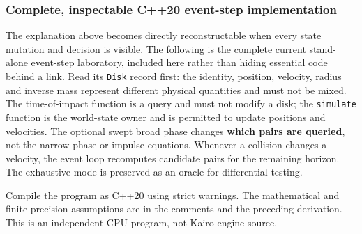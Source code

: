 \subsubsection{Complete, inspectable C++20 event-step implementation}\label{06-engine-ii-ch046-complete-inspectable-c20-event-step-implementation}

The explanation above becomes directly reconstructable when every state mutation and decision is visible. The following is the complete current stand-alone event-step laboratory, included here rather than hiding essential code behind a link. Read its \texttt{Disk} record first: the identity, position, velocity, radius and inverse mass represent different physical quantities and must not be mixed. The time-of-impact function is a query and must not modify a disk; the \texttt{simulate} function is the world-state owner and is permitted to update positions and velocities. The optional swept broad phase changes \textbf{which pairs are queried}, not the narrow-phase or impulse equations. Whenever a collision changes a velocity, the event loop recomputes candidate pairs for the remaining horizon. The exhaustive mode is preserved as an oracle for differential testing.

Compile the program as C++20 using strict warnings. The mathematical and finite-precision assumptions are in the comments and the preceding derivation. This is an independent CPU program, not Kairo engine source.

